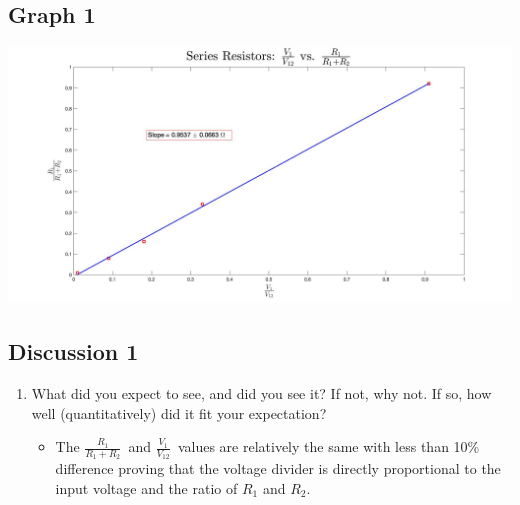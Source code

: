 \documentclass{article}
\def\RDIV{\(\frac{R_{\text{1}}}{R_{\text{1}}+R_{\text{2}}}\)}
\def\VDIV{\(\frac{V_{\text{1}}}{V_{\text{12}}}\)}
\begin{document}
\begin{table}[!htp]
\begin{center}
    \subsection*{Graph 1}
    \includegraphics[scale=0.2]{series.jpg}
    \subsection*{Discussion 1}
    \begin{enumerate}
      \item What did you expect to see, and did you see it? If not, why not. If so, how well (quantitatively) did it fit your expectation?
      \begin{itemize}
        \item The \RDIV\ and \VDIV\ values are relatively the same with less than 10\% difference proving that the voltage divider is directly proportional to the input voltage and the ratio of \(R_1\) and \(R_{2}\).
      \end{itemize}
    \end{enumerate}
  \end{center}
\end{table}
\newpage
\end{document}
